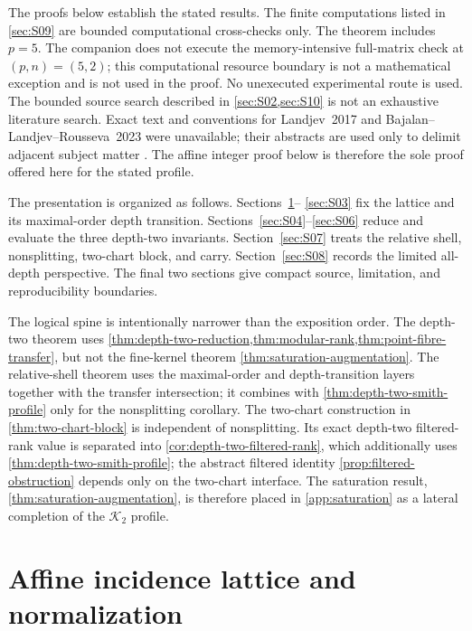 \documentclass[12pt,a4paper]{article}
\theoremstyle{definition}
\begin{document}
The proofs below establish the stated results.  The finite computations listed in
\cref{sec:S09} are bounded computational cross-checks only.  The theorem
includes $p=5$.  The companion does not execute the memory-intensive
full-matrix check at $(p,n)=(5,2)$; this computational resource boundary is
not a mathematical exception and is not used in the proof.  No unexecuted
experimental route is used.
The bounded source search described in \cref{sec:S02,sec:S10} is not an
exhaustive literature search.  Exact text and conventions for
Landjev~2017 and Bajalan--Landjev--Rousseva~2023 were unavailable; their
abstracts are used only to delimit adjacent subject matter
\cite{LAN17,BLR23}.  The affine integer proof below is therefore the sole
proof offered here for the stated profile.

The presentation is organized as follows.  Sections~\ref{sec:S01}--
\ref{sec:S03} fix the lattice and its maximal-order depth transition.
Sections~\ref{sec:S04}--\ref{sec:S06} reduce and evaluate the three
depth-two invariants.  Section~\ref{sec:S07} treats the relative shell,
nonsplitting, two-chart block, and carry.  Section~\ref{sec:S08} records the
limited all-depth perspective.  The final two sections give compact source,
limitation, and reproducibility boundaries.

The logical spine is intentionally narrower than the exposition order.
The depth-two theorem uses \cref{thm:depth-two-reduction,thm:modular-rank,thm:point-fibre-transfer}, but not the
fine-kernel theorem \cref{thm:saturation-augmentation}.  The relative-shell theorem uses the
maximal-order and depth-transition layers together with the transfer
intersection; it combines with \cref{thm:depth-two-smith-profile} only for the nonsplitting
corollary.  The two-chart construction in \cref{thm:two-chart-block} is independent of
nonsplitting.  Its exact depth-two filtered-rank value is separated into
\cref{cor:depth-two-filtered-rank}, which additionally uses \cref{thm:depth-two-smith-profile}; the abstract
filtered identity \cref{prop:filtered-obstruction} depends only on the two-chart interface.
The saturation result, \cref{thm:saturation-augmentation}, is therefore placed in
\cref{app:saturation} as a lateral completion of the $\mathcal K_2$ profile.

\section{Affine incidence lattice and normalization}\label{sec:S01}
\end{document}
